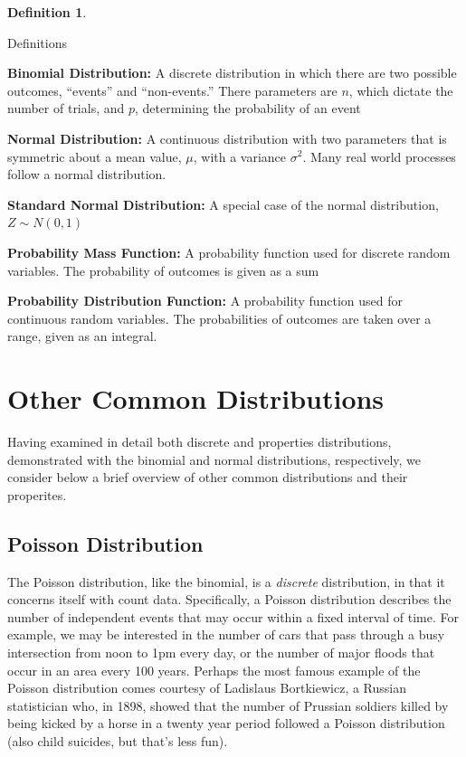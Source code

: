 \documentclass[
]{book}
\theoremstyle{definition}
\newtheorem{definition}{Definition}[chapter]
\theoremstyle{definition}
\theoremstyle{definition}
\theoremstyle{remark}
\begin{document}
\begin{definition}
\protect\hypertarget{def:unlabeled-div-2}{}\label{def:unlabeled-div-2}

Definitions

\end{definition}

\textbf{Binomial Distribution: } A discrete distribution in which there are two possible outcomes, ``events'' and ``non-events.'' There parameters are \(n\), which dictate the number of trials, and \(p\), determining the probability of an event

\textbf{Normal Distribution: } A continuous distribution with two parameters that is symmetric about a mean value, \(\mu\), with a variance \(\sigma^2\). Many real world processes follow a normal distribution.

\textbf{Standard Normal Distribution: } A special case of the normal distribution, \(Z \sim N(0, 1)\)

\textbf{Probability Mass Function: } A probability function used for discrete random variables. The probability of outcomes is given as a sum

\textbf{Probability Distribution Function: } A probability function used for continuous random variables. The probabilities of outcomes are taken over a range, given as an integral.

\hypertarget{other-common-distributions}{%
\section{Other Common Distributions}\label{other-common-distributions}}

Having examined in detail both discrete and properties distributions, demonstrated with the binomial and normal distributions, respectively, we consider below a brief overview of other common distributions and their properites.

\hypertarget{poisson-distribution}{%
\subsection{Poisson Distribution}\label{poisson-distribution}}

The Poisson distribution, like the binomial, is a \emph{discrete} distribution, in that it concerns itself with count data. Specifically, a Poisson distribution describes the number of independent events that may occur within a fixed interval of time. For example, we may be interested in the number of cars that pass through a busy intersection from noon to 1pm every day, or the number of major floods that occur in an area every 100 years. Perhaps the most famous example of the Poisson distribution comes courtesy of Ladislaus Bortkiewicz, a Russian statistician who, in 1898, showed that the number of Prussian soldiers killed by being kicked by a horse in a twenty year period followed a Poisson distribution (also child suicides, but that's less fun).
\end{document}
